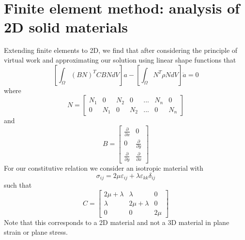 \documentclass{article}
\begin{document}
\section{Finite element method: analysis of 2D solid materials}
Extending finite elements to 2D, we find that after considering the principle 
of virtual work and approximating our solution using linear shape functions 
that 
\begin{equation}
\left[\int_{\Omega} (BN)^T C BN dV\right]a 
- \left[ \int_{\Omega} N^T \rho N dV \right]\ddot{a} = 0
\end{equation}
where
\begin{equation}
	N = 	
	\begin{bmatrix}
	N_1 & 0 & N_2 & 0 & ... & N_n & 0 \\
	0 & N_1 & 0 & N_2 & ... & 0 & N_n
	\end{bmatrix}
\end{equation}
and 
\begin{equation}
	B =
	\begin{bmatrix}
		\frac{\partial }{\partial x} & 0 \\
		0 & \frac{\partial }{\partial y} \\
		\frac{\partial }{\partial y} & \frac{\partial }{\partial x}
	\end{bmatrix}
\end{equation}
For our constitutive relation we consider an isotropic material with
\begin{equation}
	\sigma_{ij} = 2\mu\varepsilon_{ij} + \lambda\varepsilon_{kk}\delta_{ij}
\end{equation}
such that
\begin{equation}
	C = 
	\begin{bmatrix}
	2\mu+\lambda & \lambda & 0 \\
	\lambda & 2\mu + \lambda & 0 \\
	0 & 0 & 2\mu 
	\end{bmatrix}
\end{equation}
Note that this corresponds to a 2D material and not a 3D material in plane 
strain or plane stress.
\end{document}

